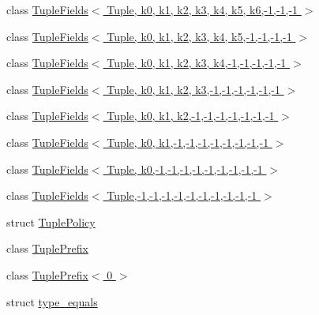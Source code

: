 \begin{DoxyCompactItemize}
\item 
class \hyperlink{classtesting_1_1internal_1_1_tuple_fields_3_01_tuple_00_01k0_00_01k1_00_01k2_00_01k3_00_01k4_00_deaa5da4e1bb5d2f3cddb0c4b1a35a07}{Tuple\+Fields$<$ Tuple, k0, k1, k2, k3, k4, k5, k6,-\/1,-\/1,-\/1 $>$}
\item 
class \hyperlink{classtesting_1_1internal_1_1_tuple_fields_3_01_tuple_00_01k0_00_01k1_00_01k2_00_01k3_00_01k4_00_01k5_00-1_00-1_00-1_00-1_01_4}{Tuple\+Fields$<$ Tuple, k0, k1, k2, k3, k4, k5,-\/1,-\/1,-\/1,-\/1 $>$}
\item 
class \hyperlink{classtesting_1_1internal_1_1_tuple_fields_3_01_tuple_00_01k0_00_01k1_00_01k2_00_01k3_00_01k4_00-1_00-1_00-1_00-1_00-1_01_4}{Tuple\+Fields$<$ Tuple, k0, k1, k2, k3, k4,-\/1,-\/1,-\/1,-\/1,-\/1 $>$}
\item 
class \hyperlink{classtesting_1_1internal_1_1_tuple_fields_3_01_tuple_00_01k0_00_01k1_00_01k2_00_01k3_00-1_00-1_00-1_00-1_00-1_00-1_01_4}{Tuple\+Fields$<$ Tuple, k0, k1, k2, k3,-\/1,-\/1,-\/1,-\/1,-\/1,-\/1 $>$}
\item 
class \hyperlink{classtesting_1_1internal_1_1_tuple_fields_3_01_tuple_00_01k0_00_01k1_00_01k2_00-1_00-1_00-1_00-1_00-1_00-1_00-1_01_4}{Tuple\+Fields$<$ Tuple, k0, k1, k2,-\/1,-\/1,-\/1,-\/1,-\/1,-\/1,-\/1 $>$}
\item 
class \hyperlink{classtesting_1_1internal_1_1_tuple_fields_3_01_tuple_00_01k0_00_01k1_00-1_00-1_00-1_00-1_00-1_00-1_00-1_00-1_01_4}{Tuple\+Fields$<$ Tuple, k0, k1,-\/1,-\/1,-\/1,-\/1,-\/1,-\/1,-\/1,-\/1 $>$}
\item 
class \hyperlink{classtesting_1_1internal_1_1_tuple_fields_3_01_tuple_00_01k0_00-1_00-1_00-1_00-1_00-1_00-1_00-1_00-1_00-1_01_4}{Tuple\+Fields$<$ Tuple, k0,-\/1,-\/1,-\/1,-\/1,-\/1,-\/1,-\/1,-\/1,-\/1 $>$}
\item 
class \hyperlink{classtesting_1_1internal_1_1_tuple_fields_3_01_tuple_00-1_00-1_00-1_00-1_00-1_00-1_00-1_00-1_00-1_00-1_01_4}{Tuple\+Fields$<$ Tuple,-\/1,-\/1,-\/1,-\/1,-\/1,-\/1,-\/1,-\/1,-\/1,-\/1 $>$}
\item 
struct \hyperlink{structtesting_1_1internal_1_1_tuple_policy}{Tuple\+Policy}
\item 
class \hyperlink{classtesting_1_1internal_1_1_tuple_prefix}{Tuple\+Prefix}
\item 
class \hyperlink{classtesting_1_1internal_1_1_tuple_prefix_3_010_01_4}{Tuple\+Prefix$<$ 0 $>$}
\item 
struct \hyperlink{structtesting_1_1internal_1_1type__equals}{type\+\_\+equals}
\item 

\end{DoxyCompactItemize}
